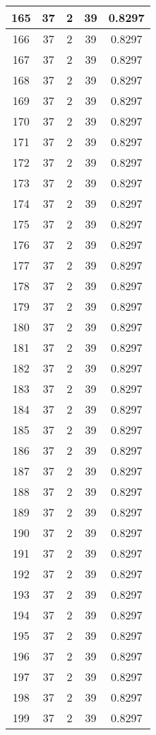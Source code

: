 \documentclass[letterpaper, 12pt]{article}
\begin{document}
\begin{longtable}{|c|c|c|c|c|}
\hline
165 & 37 & 2 & 39 & 0.8297 \\
\hline
166 & 37 & 2 & 39 & 0.8297 \\
\hline
167 & 37 & 2 & 39 & 0.8297 \\
\hline
168 & 37 & 2 & 39 & 0.8297 \\
\hline
169 & 37 & 2 & 39 & 0.8297 \\
\hline
170 & 37 & 2 & 39 & 0.8297 \\
\hline
171 & 37 & 2 & 39 & 0.8297 \\
\hline
172 & 37 & 2 & 39 & 0.8297 \\
\hline
173 & 37 & 2 & 39 & 0.8297 \\
\hline
174 & 37 & 2 & 39 & 0.8297 \\
\hline
175 & 37 & 2 & 39 & 0.8297 \\
\hline
176 & 37 & 2 & 39 & 0.8297 \\
\hline
177 & 37 & 2 & 39 & 0.8297 \\
\hline
178 & 37 & 2 & 39 & 0.8297 \\
\hline
179 & 37 & 2 & 39 & 0.8297 \\
\hline
180 & 37 & 2 & 39 & 0.8297 \\
\hline
181 & 37 & 2 & 39 & 0.8297 \\
\hline
182 & 37 & 2 & 39 & 0.8297 \\
\hline
183 & 37 & 2 & 39 & 0.8297 \\
\hline
184 & 37 & 2 & 39 & 0.8297 \\
\hline
185 & 37 & 2 & 39 & 0.8297 \\
\hline
186 & 37 & 2 & 39 & 0.8297 \\
\hline
187 & 37 & 2 & 39 & 0.8297 \\
\hline
188 & 37 & 2 & 39 & 0.8297 \\
\hline
189 & 37 & 2 & 39 & 0.8297 \\
\hline
190 & 37 & 2 & 39 & 0.8297 \\
\hline
191 & 37 & 2 & 39 & 0.8297 \\
\hline
192 & 37 & 2 & 39 & 0.8297 \\
\hline
193 & 37 & 2 & 39 & 0.8297 \\
\hline
194 & 37 & 2 & 39 & 0.8297 \\
\hline
195 & 37 & 2 & 39 & 0.8297 \\
\hline
196 & 37 & 2 & 39 & 0.8297 \\
\hline
197 & 37 & 2 & 39 & 0.8297 \\
\hline
198 & 37 & 2 & 39 & 0.8297 \\
\hline
199 & 37 & 2 & 39 & 0.8297 \\
\hline
\end{longtable}
\end{document}
